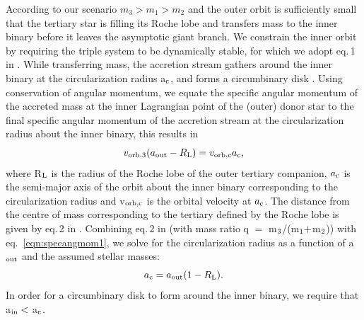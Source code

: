 \documentclass[twocolumn]{aastex62}
\begin{document}
According to our scenario $m_3 > m_1 > m_2$ and the outer orbit is
sufficiently small that the tertiary star is filling its Roche lobe
and transfers mass to the inner binary before it leaves the asymptotic
giant branch. We constrain the inner orbit by requiring the triple
system to be dynamically stable, for which we adopt eq.\,1 in
\cite{1999ASIC..522..385M}.  While transferring mass, the accretion
stream gathers around the inner binary at the circularization radius
a$_{\rm c}$, and forms a circumbinary disk
\citep{2002apa..book.....F}.  Using conservation of angular momentum,
we equate the specific angular momentum of the accreted mass at the
inner Lagrangian point of the (outer) donor star to the final specific
angular momentum of the accretion stream at the circularization radius
about the inner binary, this results in
\begin{equation}
\label{eqn:specangmom1}
v_{\rm orb,3}(a_{\rm out} - R_{\rm L}) = v_{\rm orb,c}a_{\rm c},
\end{equation}
where R$_{\rm L}$ is the radius of the Roche lobe of the outer
tertiary companion, $a_{\rm c}$ is the semi-major axis of the orbit
about the inner binary corresponding to the circularization radius and
v$_{\rm orb,c}$ is the orbital velocity at $a_{\rm c}$.  The distance
from the centre of mass corresponding to the tertiary defined by the
Roche lobe is given by eq.\,2 in \cite{1983ApJ...268..368E}.
Combining eq.\,2 in \citet{1983ApJ...268..368E} (with mass ratio q
$=$ m$_{\rm 3}$/(m$_{\rm 1} +$m$_{\rm 2}$)) with
eq.~\ref{eqn:specangmom1}, we solve for the circularization
radius as a function of a$_{\rm out}$ and the assumed stellar masses:
\begin{equation}
\label{eqn:ac}
a_{\rm c} = a_{\rm out}(1 - R_{\rm L}).
\end{equation}
In order for a circumbinary disk to form around the inner binary, we
require that a$_{\rm in} <$ a$_{\rm c}$.
\end{document}
